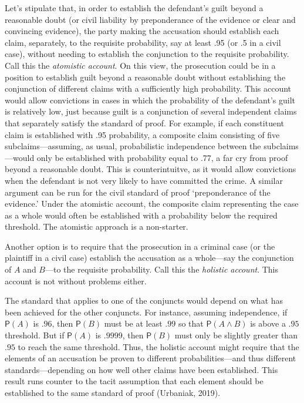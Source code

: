 \documentclass[
  10pt,
  dvipsnames,enabledeprecatedfontcommands]{scrartcl}
\newcommand{\et}{\wedge}
\newcommand{\pr}[1]{\ensuremath{\mathsf{P}(#1)}}
\begin{document}
Let's stipulate that, in order to establish the defendant's guilt beyond
a reasonable doubt (or civil liability by preponderance of the evidence
or clear and convincing evidence), the party making the accusation
should establish each claim, separately, to the requisite probability,
say at least .95 (or .5 in a civil case), without needing to establish
the conjunction to the requisite probability. Call this the
\textit{atomistic account}. On this view, the prosecution could be in a
position to establish guilt beyond a reasonable doubt without
establishing the conjunction of different claims with a sufficiently
high probability. This account would allow convictions in cases in which
the probability of the defendant's guilt is relatively low, just because
guilt is a conjunction of several independent claims that separately
satisfy the standard of proof. For example, if each constituent claim is
established with .95 probability, a composite claim consisting of five
subclaims---assuming, as usual, probabilistic independence between the
subclaims---would only be established with probability equal to .77, a
far cry from proof beyond a reasonable doubt. This is counterintuitve,
as it would allow convictions when the defendant is not very likely to
have committed the crime. A similar argument can be run for the civil
standard of proof `preponderance of the evidence.' Under the atomistic
account, the composite claim representing the case as a whole would
often be established with a probability below the required threshold.
The atomistic approach is a non-starter.

Another option is to require that the prosecution in a criminal case (or
the plaintiff in a civil case) establish the accusation as a whole---say
the conjunction of \(A\) and \(B\)---to the requisite probability. Call
this the \textit{holistic account}. This account is not without problems
either.

The standard that applies to one of the conjuncts would depend on what
has been achieved for the other conjuncts. For instance, assuming
independence, if \(\pr{A}\) is \(.96\), then \(\pr{B}\) must be at least
\(.99\) so that \(\pr{A\et B}\) is above a \(.95\) threshold. But if
\(\pr{A}\) is \(.9999\), then \(\pr{B}\) must only be slightly greater
than \(.95\) to reach the same threshold. Thus, the holistic account
might require that the elements of an accusation be proven to different
probabilities---and thus different standards---depending on how well
other claims have been established. This result runs counter to the
tacit assumption that each element should be established to the same
standard of proof (Urbaniak, 2019).
\end{document}
